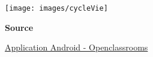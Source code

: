 \documentclass[francais,12pt]{article}
\begin{document}
		\begin{center}
			\texttt{[image: images/cycleVie]}
		\end{center}	
		
		\textbf{Source}
        
        \href{https://openclassrooms.com/courses/creez-des-applications-pour-android/preambule-quelques-concepts-avances}{Application Android - Openclassrooms}
        
\end{document}

